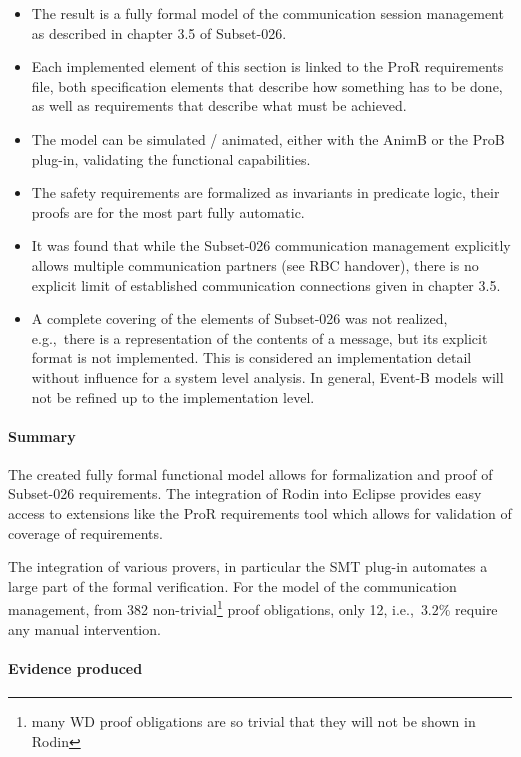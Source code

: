 \begin{itemize}
\item The result is a fully formal model of the communication session management
  as described in chapter 3.5 of Subset-026.
\item Each implemented element of this section is linked to the ProR
  requirements file, both specification elements that describe how something has
  to be done, as well as requirements that describe what must be achieved.
\item The model can be simulated / animated, either with the AnimB or the ProB
  plug-in, validating the functional capabilities.
\item The safety requirements are formalized as invariants in predicate logic,
  their proofs are for the most part fully automatic.
\item It was found that while the Subset-026 communication management explicitly
  allows multiple communication partners (see RBC handover), there is no
  explicit limit of established communication connections given in chapter 3.5.
\item A complete covering of the elements of Subset-026 was not realized, e.g.,\
  there is a representation of the contents of a message, but its explicit
  format is not implemented. This is considered an implementation detail without
  influence for a system level analysis. In general, Event-B models will not be
  refined up to the implementation level.
\end{itemize}

\paragraph{Summary}

The created fully formal functional model allows for formalization and proof of
Subset-026 requirements. The integration of Rodin into Eclipse provides easy access
to extensions like the ProR requirements tool which allows for validation of
coverage of requirements.

The integration of various provers, in particular the SMT plug-in automates a
large part of the formal verification. For the model of the communication
management, from 382 non-trivial\footnote{many WD proof obligations are so
  trivial that they will not be shown in Rodin} proof obligations, only 12,
i.e.,\ $3.2\%$ require any manual intervention.

\paragraph{Evidence produced}
\label{sec:evidence-produced}

